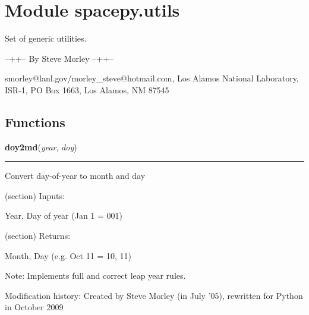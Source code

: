 %
%
%


\section{Module spacepy.utils}

    \label{spacepy:utils}
Set of generic utilities.

--++-- By Steve Morley --++--

smorley@lanl.gov/morley\_steve@hotmail.com, Los Alamos National Laboratory,
ISR-1, PO Box 1663, Los Alamos, NM 87545



  \subsection{Functions}

    \label{spacepy:utils:doy2md}

    \vspace{0.5ex}

\hspace{.8\funcindent}\begin{boxedminipage}{\funcwidth}

    \raggedright \textbf{doy2md}(\textit{year}, \textit{doy})

    \vspace{-1.5ex}

    \rule{\textwidth}{0.5\fboxrule}
\setlength{\parskip}{2ex}
    Convert day-of-year to month and day

    (section) Inputs:

      Year, Day of year (Jan 1 = 001)

    (section) Returns:

      Month, Day (e.g. Oct 11 = 10, 11)

      Note: Implements full and correct leap year rules.

      Modification history: Created by Steve Morley (in July '05), 
      rewritten for Python in October 2009

\setlength{\parskip}{1ex}
    \end{boxedminipage}

